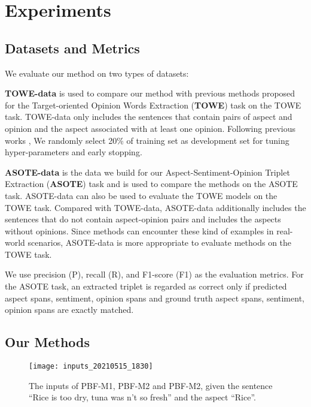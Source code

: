 \documentclass[11pt]{article}
\begin{document}
\section{Experiments}
\subsection{Datasets and Metrics}
We evaluate our method on two types of datasets:

\textbf{TOWE-data} \citep{fan2019target} is used to compare our method with previous methods proposed for the Target-oriented Opinion Words Extraction (\textbf{TOWE}) task on the TOWE task. TOWE-data only includes the sentences that contain pairs of aspect and opinion and the aspect associated with at least one opinion. Following previous works \citep{fan2019target, wu2020latent},  We randomly select 20\% of training set as development set for tuning hyper-parameters and early stopping. 

\textbf{ASOTE-data} is the data we build for our Aspect-Sentiment-Opinion Triplet Extraction (\textbf{ASOTE}) task and is used to compare the methods on the ASOTE task. ASOTE-data can also be used to evaluate the TOWE models on the TOWE task.  Compared with TOWE-data, ASOTE-data additionally includes the sentences that do not contain aspect-opinion pairs and includes the aspects without opinions. Since methods can encounter these kind of examples in real-world scenarios, ASOTE-data is more appropriate to evaluate methods on the TOWE task. 

We use precision (P), recall (R), and F1-score (F1) as the evaluation metrics. For the ASOTE task, an extracted triplet is regarded as correct only if predicted aspect spans, sentiment, opinion spans and ground truth aspect spans, sentiment, opinion spans are exactly matched.

\subsection{Our Methods}

\begin{figure}
	\centering
	\texttt{[image: inputs\_20210515\_1830]}
	\caption{The inputs of PBF-M1, PBF-M2 and PBF-M2, given the sentence ``Rice is too dry, tuna was n't so fresh'' and the aspect ``Rice''.}
	\label{fig:inputs}
\end{figure}
\end{document}
